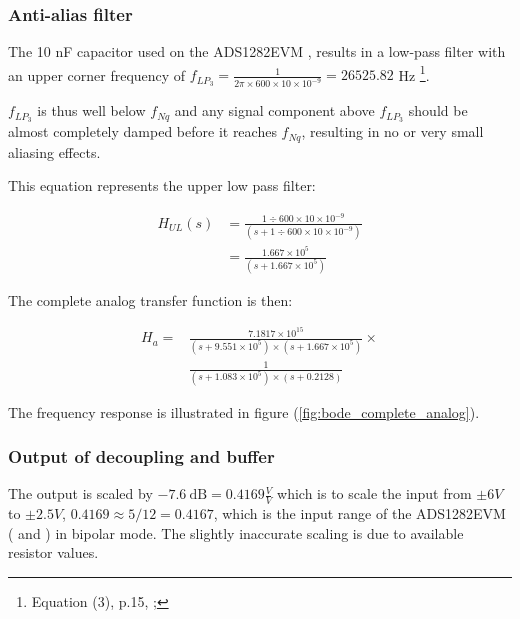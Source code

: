 \documentclass[a4paper]{article}
\begin{document}
  \begin{multicols}{2}

\subsubsection{Anti-alias filter}
The 10 nF capacitor used on the ADS1282EVM
\cite{ads1282evm_ds}, results in a low-pass filter with an upper corner frequency of $f_{LP_3} =
\frac{1}{2 \pi \times 600 \times 10 \times 10^{-9}} = 26525.82 $ Hz
\footnote{Equation (3), p.15, \cite{ads1282_ds}; }.

$f_{LP_3}$ is thus well below $f_{Nq}$ and any signal component above $f_{LP_3}$ should
be almost completely damped before it reaches $f_{Nq}$, resulting in no
or very small aliasing effects.

This equation represents the upper low pass filter:
\begin{center}
\begin{equation}
  \begin{aligned}
  H_{UL}(s) &= \frac{1 \div 600 \times 10 \times 10^{-9}}
                   {(s + 1 \div 600 \times 10 \times 10^{-9})} \\
            &= \frac{1.667 \times 10^5}{(s + 1.667 \times 10^5)}
  \end{aligned}
  \label{eqn:transfer_upper_lowpass}
\end{equation}
\end{center}

The complete analog transfer function is then:
\begin{center}
\begin{equation}
  \begin{aligned}
  H_{a} = &\frac{7.1817 \times 10^{15}}
                { (s + 9.551 \times 10^5) \times
                   (s + 1.667 \times 10^5)
                 } \times \\
          & \frac{1}
                 {(s + 1.083 \times 10^5) \times
                  (s + 0.2128) }
  \end{aligned}
  \label{eqn:transfer_analog}
\end{equation}
\end{center}


The frequency response is illustrated in figure
(\ref{fig:bode_complete_analog}).
\subsubsection{Output of decoupling and buffer} The output is scaled by $-7.6\ \text{dB} =
0.4169 \frac{V}{V}$ which is to scale the input from $\pm 6V$ to $\pm 2.5V$, $0.4169
\approx 5 / 12 = 0.4167$, which is the input range of the ADS1282EVM
(\cite{ads1282evm_ds} and \cite{ads1282_ds}) in bipolar mode. The
slightly inaccurate scaling is due to available resistor values.


\end{multicols}
\end{document}
